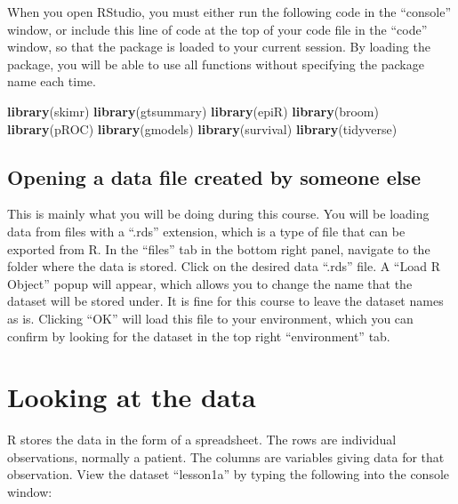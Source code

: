 \documentclass[]{book}
\newenvironment{Shaded}{\begin{snugshade}}{\end{snugshade}}
\newcommand{\KeywordTok}[1]{\textcolor[rgb]{0.13,0.29,0.53}{\textbf{#1}}}
\newcommand{\NormalTok}[1]{#1}
\begin{document}
When you open RStudio, you must either run the following code in the ``console'' window, or include this line of code at the top of your code file in the ``code'' window, so that the package is loaded to your current session. By loading the package, you will be able to use all functions without specifying the package name each time.

\begin{Shaded}
\begin{Highlighting}[]
\KeywordTok{library}\NormalTok{(skimr)}
\KeywordTok{library}\NormalTok{(gtsummary)}
\KeywordTok{library}\NormalTok{(epiR)}
\KeywordTok{library}\NormalTok{(broom)}
\KeywordTok{library}\NormalTok{(pROC)}
\KeywordTok{library}\NormalTok{(gmodels)}
\KeywordTok{library}\NormalTok{(survival)}
\KeywordTok{library}\NormalTok{(tidyverse)}
\end{Highlighting}
\end{Shaded}

\hypertarget{opening-a-data-file-created-by-someone-else}{%
\subsection{Opening a data file created by someone else}\label{opening-a-data-file-created-by-someone-else}}

This is mainly what you will be doing during this course. You will be loading data from files with a ``.rds'' extension, which is a type of file that can be exported from R. In the ``files'' tab in the bottom right panel, navigate to the folder where the data is stored. Click on the desired data ``.rds'' file. A ``Load R Object'' popup will appear, which allows you to change the name that the dataset will be stored under. It is fine for this course to leave the dataset names as is. Clicking ``OK'' will load this file to your environment, which you can confirm by looking for the dataset in the top right ``environment'' tab.

\hypertarget{looking-at-the-data}{%
\section{Looking at the data}\label{looking-at-the-data}}

R stores the data in the form of a spreadsheet. The rows are individual observations, normally a patient. The columns are variables giving data for that observation. View the dataset ``lesson1a'' by typing the following into the console window:
\end{document}
